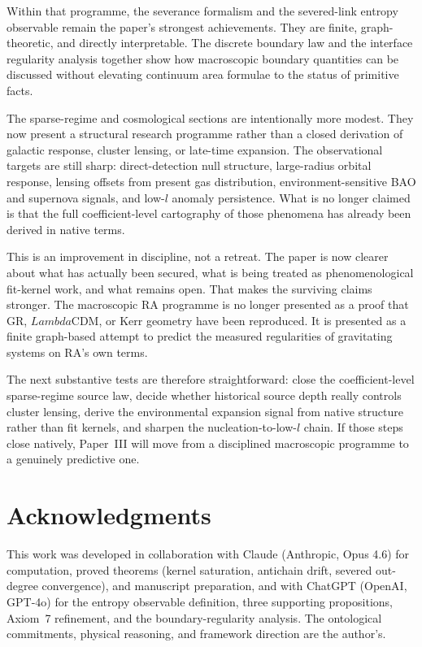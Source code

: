 \documentclass[11pt]{article}
\def\ell{l}%
\def\Lambda{Lambda}%
\begin{document}
Within that programme, the severance formalism and the severed-link entropy observable remain the paper's strongest achievements. They are finite, graph-theoretic, and directly interpretable. The discrete boundary law and the interface regularity analysis together show how macroscopic boundary quantities can be discussed without elevating continuum area formulae to the status of primitive facts.

The sparse-regime and cosmological sections are intentionally more modest. They now present a structural research programme rather than a closed derivation of galactic response, cluster lensing, or late-time expansion. The observational targets are still sharp: direct-detection null structure, large-radius orbital response, lensing offsets from present gas distribution, environment-sensitive BAO and supernova signals, and low-$\ell$ anomaly persistence. What is no longer claimed is that the full coefficient-level cartography of those phenomena has already been derived in native terms.

This is an improvement in discipline, not a retreat. The paper is now clearer about what has actually been secured, what is being treated as phenomenological fit-kernel work, and what remains open. That makes the surviving claims stronger. The macroscopic RA programme is no longer presented as a proof that GR, $\Lambda$CDM, or Kerr geometry have been reproduced. It is presented as a finite graph-based attempt to predict the measured regularities of gravitating systems on RA's own terms.

The next substantive tests are therefore straightforward: close the coefficient-level sparse-regime source law, decide whether historical source depth really controls cluster lensing, derive the environmental expansion signal from native structure rather than fit kernels, and sharpen the nucleation-to-low-$\ell$ chain. If those steps close natively, Paper~III will move from a disciplined macroscopic programme to a genuinely predictive one.

\section*{Acknowledgments}

This work was developed in collaboration with Claude (Anthropic, Opus 4.6) for computation, proved theorems (kernel saturation, antichain drift, severed out-degree convergence), and manuscript preparation, and with ChatGPT (OpenAI, GPT-4o) for the entropy observable definition, three supporting propositions, Axiom~7 refinement, and the boundary-regularity analysis. The ontological commitments, physical reasoning, and framework direction are the author's.
\end{document}

